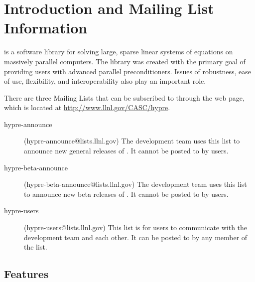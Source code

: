 
\chapter{Introduction and Mailing List Information}
\label{ch-Introduction}

\hypre{} is a software library for solving large, sparse linear
systems of equations on massively parallel computers.  The library was
created with the primary goal of providing users with advanced
parallel preconditioners.  Issues of robustness, ease of use,
flexibility, and interoperability also play an important role.


There are three \hypre{} Mailing Lists that can be subscribed to through the
\hypre{} web page, which is located at \url{http://www.llnl.gov/CASC/hypre}.

\begin{description}
\item [hypre-announce] (hypre-announce@lists.llnl.gov) The development team
uses this list to announce new general releases of \hypre{}.  It cannot be
posted to by users.

\item [hypre-beta-announce] (hypre-beta-announce@lists.llnl.gov) The
development team uses this list to announce new beta releases of \hypre{}.  It
cannot be posted to by users.

\item [hypre-users] (hypre-users@lists.llnl.gov) This list is for \hypre{}
users to communicate with the development team and each other.  It can be
posted to by any member of the list.
\end{description}


\section{Features}
\label{Features}

